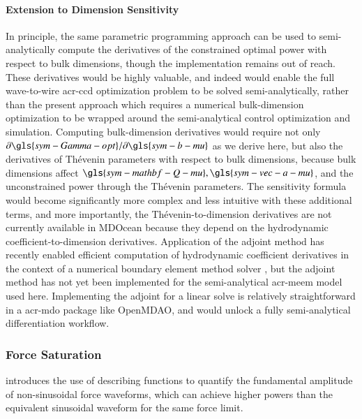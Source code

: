 \paragraph{Extension to Dimension Sensitivity}
\label{sec:appendix-dimension-sensitivity}
In principle, the same parametric programming approach can be used to semi-analytically compute the derivatives of the constrained optimal power with respect to bulk dimensions,
though the implementation remains out of reach.
These derivatives would be highly valuable, and indeed would enable the full wave-to-wire \gls{acr-ccd} optimization problem to be solved semi-analytically, rather than the present approach which requires a numerical bulk-dimension optimization to be wrapped around the semi-analytical control optimization and simulation.
Computing bulk-dimension derivatives would require not only $\partial \gls{sym-Gamma-opt}/\partial \gls{sym-b-mu}$ as we derive here,
but also the derivatives of Th\'{e}venin parameters with respect to bulk dimensions,
because bulk dimensions affect $\gls{sym-mathbf-Q-mu}, \gls{sym-vec-a-mu}$, and the unconstrained power through the Th\'{e}venin parameters.
The sensitivity formula would become significantly more complex and less intuitive with these additional terms,
and more importantly, the Th\'{e}venin-to-dimension derivatives are not currently available in MDOcean because they depend on the hydrodynamic coefficient-to-dimension derivatives.
Application of the adjoint method has recently enabled efficient computation of hydrodynamic coefficient derivatives in the context of a numerical boundary element method solver \citep{khanal_fully_2025},
but the adjoint method has not yet been implemented for the semi-analytical \gls{acr-meem} model used here.
Implementing the adjoint for a linear solve is relatively straightforward in a \gls{acr-mdo} package like OpenMDAO,
and would unlock a fully semi-analytical differentiation workflow.


\subsubsection{Force Saturation}
\label{sec:appendix-force-sat}
 introduces the use of describing functions to quantify the fundamental amplitude of non-sinusoidal force waveforms, which can achieve higher powers than the equivalent sinusoidal waveform for the same force limit.

